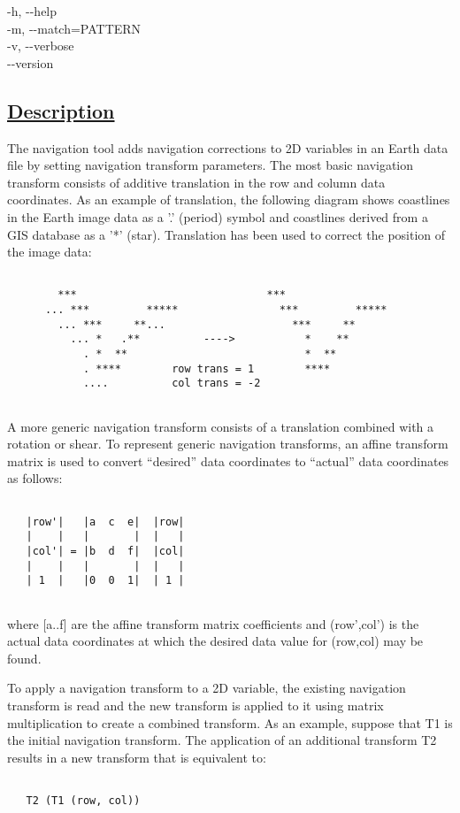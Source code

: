   -h, -{-}help \\ 
 -m, -{-}match=PATTERN \\ 
 -v, -{-}verbose \\ 
 -{-}version \\ 

\subsection*{\underline{Description}}


  The navigation tool adds navigation corrections to 2D variables in an Earth data file by setting navigation transform parameters. The most basic navigation transform consists of additive translation in the row and column data coordinates. As an example of translation, the following diagram shows coastlines in the Earth image data as a '.' (period) symbol and coastlines derived from a GIS database as a '*' (star). Translation has been used to correct the position of the image data: \begin{verbatim}

        ***                              ***
      ... ***         *****                ***         *****
        ... ***     **...                    ***     **
          ... *   .**          ---->           *    **
            . *  **                            *  **
            . ****        row trans = 1        ****
            ....          col trans = -2
 
\end{verbatim}



 A more generic navigation transform consists of a translation combined with a rotation or shear. To represent generic navigation transforms, an affine transform matrix is used to convert ``desired'' data coordinates to ``actual'' data coordinates as follows: \begin{verbatim}

   |row'|   |a  c  e|  |row|
   |    |   |       |  |   |
   |col'| = |b  d  f|  |col|
   |    |   |       |  |   |   
   | 1  |   |0  0  1|  | 1 | 
 
\end{verbatim}
 where [a..f] are the affine transform matrix coefficients and (row',col') is the actual data coordinates at which the desired data value for (row,col) may be found.


 To apply a navigation transform to a 2D variable, the existing navigation transform is read and the new transform is applied to it using matrix multiplication to create a combined transform. As an example, suppose that T1 is the initial navigation transform. The application of an additional transform T2 results in a new transform that is equivalent to: \begin{verbatim}

   T2 (T1 (row, col))
 
\end{verbatim}



